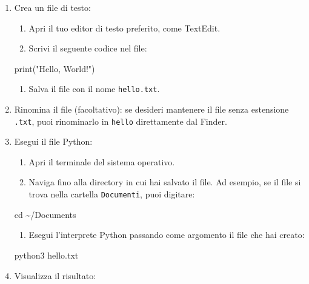 \documentclass[
  letterpaper,
]{scrbook}
\newenvironment{Shaded}{\begin{snugshade}}{\end{snugshade}}
\newcommand{\BuiltInTok}[1]{\textcolor[rgb]{0.00,0.23,0.31}{#1}}
\newcommand{\ExtensionTok}[1]{\textcolor[rgb]{0.00,0.23,0.31}{#1}}
\newcommand{\NormalTok}[1]{\textcolor[rgb]{0.00,0.23,0.31}{#1}}
\newcommand{\StringTok}[1]{\textcolor[rgb]{0.13,0.47,0.30}{#1}}
\providecommand{\tightlist}{%
  \setlength{\itemsep}{0pt}\setlength{\parskip}{0pt}}\usepackage{longtable,booktabs,array}
\begin{document}
\begin{enumerate}
\def\labelenumi{\arabic{enumi}.}
\item
  Crea un file di testo:

  \begin{enumerate}
  \def\labelenumii{\roman{enumii}.}
  \tightlist
  \item
    Apri il tuo editor di testo preferito, come TextEdit.
  \item
    Scrivi il seguente codice nel file:
  \end{enumerate}

\begin{Shaded}
\begin{Highlighting}[]
\BuiltInTok{print}\NormalTok{(}\StringTok{"Hello, World!"}\NormalTok{)}
\end{Highlighting}
\end{Shaded}

  \begin{enumerate}
  \def\labelenumii{\roman{enumii}.}
  \setcounter{enumii}{2}
  \tightlist
  \item
    Salva il file con il nome \texttt{hello.txt}.
  \end{enumerate}
\item
  Rinomina il file (facoltativo): se desideri mantenere il file senza
  estensione \texttt{.txt}, puoi rinominarlo in \texttt{hello}
  direttamente dal Finder.
\item
  Esegui il file Python:

  \begin{enumerate}
  \def\labelenumii{\roman{enumii}.}
  \tightlist
  \item
    Apri il terminale del sistema operativo.
  \item
    Naviga fino alla directory in cui hai salvato il file. Ad esempio,
    se il file si trova nella cartella \texttt{Documenti}, puoi
    digitare:
  \end{enumerate}

\begin{Shaded}
\begin{Highlighting}[]
\BuiltInTok{cd}\NormalTok{ \textasciitilde{}/Documents}
\end{Highlighting}
\end{Shaded}

  \begin{enumerate}
  \def\labelenumii{\roman{enumii}.}
  \setcounter{enumii}{2}
  \tightlist
  \item
    Esegui l'interprete Python passando come argomento il file che hai
    creato:
  \end{enumerate}

\begin{Shaded}
\begin{Highlighting}[]
\ExtensionTok{python3}\NormalTok{ hello.txt}
\end{Highlighting}
\end{Shaded}
\item
  Visualizza il risultato:
\end{enumerate}
\end{document}
